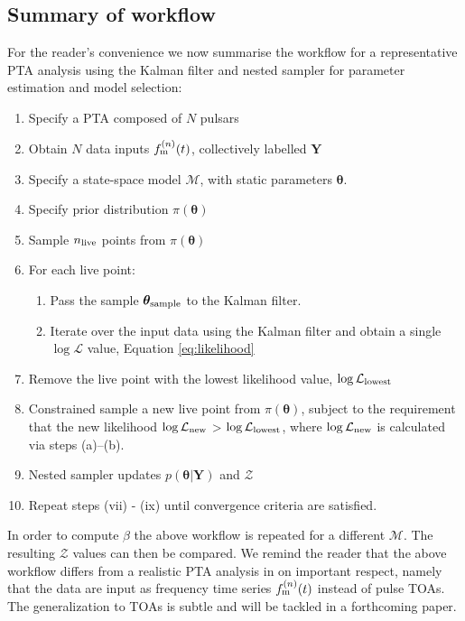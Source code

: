 \documentclass[fleqn,usenatbib,useAMS]{mnras}
\begin{document}
\subsection{Summary of workflow}\label{sec:methodsummary}
For the reader's convenience we now summarise the workflow for a representative PTA analysis using the Kalman filter and nested sampler for parameter estimation and model selection:
\begin{enumerate}[leftmargin=2em]
	\item Specify a PTA composed of $N$ pulsars 
	\item Obtain $N$ data inputs $f_{\rm m}^{(n)}(t)$, collectively labelled $\boldsymbol{Y}$
	\item Specify a state-space model $\mathcal{M}$, with static parameters $\boldsymbol{\theta}$. 
	\item Specify prior distribution $\pi(\boldsymbol{\theta})$
	 \item Sample $n_{\rm live}$ points from $\pi(\boldsymbol{\theta})$ 
	 \item For each live point:
\begin{enumerate}[leftmargin=2em]
	\item Pass the sample $\boldsymbol{\theta}_{\rm sample}$ to the Kalman filter.
	\item Iterate over the input data using the Kalman filter and obtain a single $\log \mathcal{L}$ value, Equation \eqref{eq:likelihood}
\end{enumerate}
	\item Remove the live point with the lowest likelihood value, $\log \mathcal{L}_{\rm lowest}$
	\item Constrained sample a new live point from $\pi(\boldsymbol{\theta})$, subject to the requirement that the new likelihood $\log \mathcal{L}_{\rm new}$ > $\log \mathcal{L}_{\rm lowest}$, where  $\log \mathcal{L}_{\rm new}$ is calculated via steps (a)--(b).
	\item Nested sampler updates $p\left(\boldsymbol{\theta}|\boldsymbol{Y}\right)$ and $\mathcal{Z}$ 
	\item Repeat steps (vii) - (ix) until convergence criteria are satisfied.
\end{enumerate}
In order to compute $\beta$ the above workflow is repeated for a different $\mathcal{M}$. The resulting $\mathcal{Z}$ values can then be compared. We remind the reader that the above workflow differs from a realistic PTA analysis in on important respect, namely that the data are input as frequency time series $f_{\rm m}^{(n)}(t)$ instead of pulse TOAs. The generalization to TOAs is subtle and will be tackled in a forthcoming paper.
\end{document}
